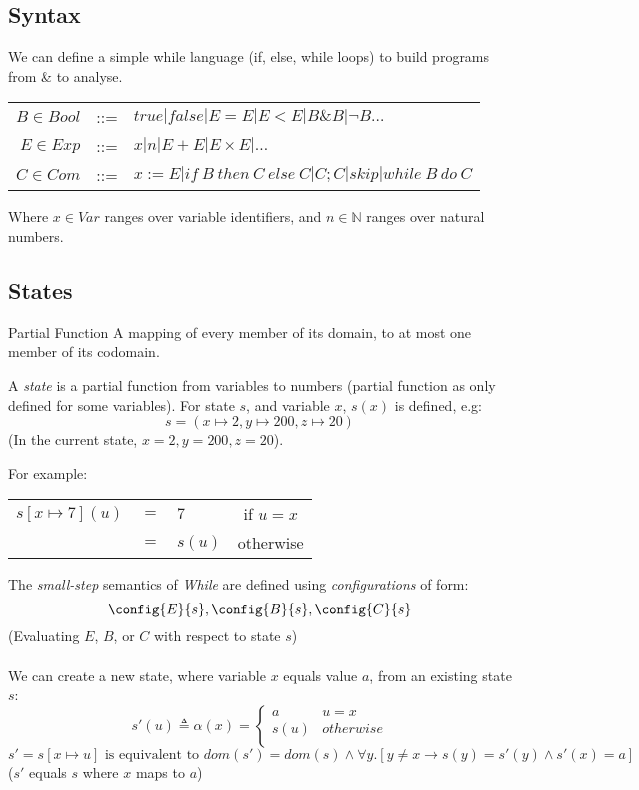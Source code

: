 \subsection{Syntax}
We can define a simple while language (if, else, while loops) to build programs from \& to analyse.
\begin{center}
	\begin{tabular}{r c l}
		$B \in Bool$ & ::= & $true | false | E = E | E < E | B \& B | \neg B \dots$                   \\
		$E \in Exp$  & ::= & $x | n | E + E | E \times E | \dots$                                     \\
		$C \in Com$  & ::= & $x :=E | if \ B \ then \ C \ else \ C | C;C | skip | while \ B \ do \ C$ \\
	\end{tabular}
\end{center}
Where $x \in Var$ ranges over variable identifiers, and $n \in \mathbb{N}$ ranges over natural numbers.

\subsection{States}
\begin{definitionbox}{Partial Function}
	A mapping of every member of its domain, to at most one member of its codomain.
\end{definitionbox}

A \textit{state} is a partial function from variables to numbers (partial function as only defined for some variables). For state $s$, and variable $x$, $s(x)$ is defined, e.g:
\[s = (x \mapsto 2, y \mapsto 200, z \mapsto 20)\]
(In the current state, $x = 2, y = 200, z = 20$).

For example:
\begin{center}
	\begin{tabular}{r c l c}
		$s[x \mapsto 7](u)$ & $=$ & $7$    & if $u = x$ \\
		                    & $=$ & $s(u)$ & otherwise  \\
	\end{tabular}
\end{center}

The \textit{small-step} semantics of \textit{While} are defined using \textit{configurations} of form:
\[\config{E}{s}, \config{B}{s}, \config{C}{s} \]
(Evaluating $E$, $B$, or $C$ with respect to state $s$)
\\
\\ We can create a new state, where variable $x$ equals value $a$, from an existing state $s$:
\[s'(u) \triangleq \alpha(x)=\begin{cases}
		a    & u = x     \\
		s(u) & otherwise \\
	\end{cases}\]
\[s' = s[x \mapsto u] \text{ is equivalent to } dom(s') = dom(s) \land \forall y.[y \neq x \rightarrow s(y) = s'(y) \land s'(x) = a]\]
($s'$ equals $s$ where $x$ maps to $a$)

